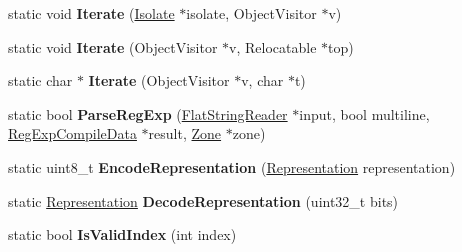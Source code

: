 \begin{DoxyCompactItemize}
\item 
\hypertarget{classv8_1_1internal_1_1_b_a_s_e___e_m_b_e_d_d_e_d_a3c9e1252c183e0f791b54a72ef8f3670}{}static void {\bfseries Iterate} (\hyperlink{classv8_1_1internal_1_1_isolate}{Isolate} $\ast$isolate, Object\+Visitor $\ast$v)\label{classv8_1_1internal_1_1_b_a_s_e___e_m_b_e_d_d_e_d_a3c9e1252c183e0f791b54a72ef8f3670}

\item 
\hypertarget{classv8_1_1internal_1_1_b_a_s_e___e_m_b_e_d_d_e_d_ab469cc06b487d927a506431a6022b166}{}static void {\bfseries Iterate} (Object\+Visitor $\ast$v, Relocatable $\ast$top)\label{classv8_1_1internal_1_1_b_a_s_e___e_m_b_e_d_d_e_d_ab469cc06b487d927a506431a6022b166}

\item 
\hypertarget{classv8_1_1internal_1_1_b_a_s_e___e_m_b_e_d_d_e_d_a9b5c2456ab6613786ae22ca7edc4357c}{}static char $\ast$ {\bfseries Iterate} (Object\+Visitor $\ast$v, char $\ast$t)\label{classv8_1_1internal_1_1_b_a_s_e___e_m_b_e_d_d_e_d_a9b5c2456ab6613786ae22ca7edc4357c}

\item 
\hypertarget{classv8_1_1internal_1_1_b_a_s_e___e_m_b_e_d_d_e_d_a1b6427d4e72df401f26856a653456ea7}{}static bool {\bfseries Parse\+Reg\+Exp} (\hyperlink{classv8_1_1internal_1_1_flat_string_reader}{Flat\+String\+Reader} $\ast$input, bool multiline, \hyperlink{structv8_1_1internal_1_1_reg_exp_compile_data}{Reg\+Exp\+Compile\+Data} $\ast$result, \hyperlink{classv8_1_1internal_1_1_zone}{Zone} $\ast$zone)\label{classv8_1_1internal_1_1_b_a_s_e___e_m_b_e_d_d_e_d_a1b6427d4e72df401f26856a653456ea7}

\item 
\hypertarget{classv8_1_1internal_1_1_b_a_s_e___e_m_b_e_d_d_e_d_a32547b80b9e0b530de324e494a846618}{}static uint8\+\_\+t {\bfseries Encode\+Representation} (\hyperlink{classv8_1_1internal_1_1_representation}{Representation} representation)\label{classv8_1_1internal_1_1_b_a_s_e___e_m_b_e_d_d_e_d_a32547b80b9e0b530de324e494a846618}

\item 
\hypertarget{classv8_1_1internal_1_1_b_a_s_e___e_m_b_e_d_d_e_d_ab4ccbd094102e50ee3f7cddde14932a6}{}static \hyperlink{classv8_1_1internal_1_1_representation}{Representation} {\bfseries Decode\+Representation} (uint32\+\_\+t bits)\label{classv8_1_1internal_1_1_b_a_s_e___e_m_b_e_d_d_e_d_ab4ccbd094102e50ee3f7cddde14932a6}

\item 
\hypertarget{classv8_1_1internal_1_1_b_a_s_e___e_m_b_e_d_d_e_d_aa472bfe28747bf7a2f5d7305a7ca2226}{}static bool {\bfseries Is\+Valid\+Index} (int index)\label{classv8_1_1internal_1_1_b_a_s_e___e_m_b_e_d_d_e_d_aa472bfe28747bf7a2f5d7305a7ca2226}


\end{DoxyCompactItemize}
